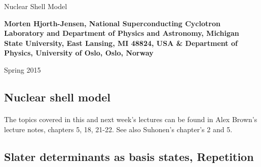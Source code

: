 \documentclass[%
twoside,                 %
final,                   %
10pt]{article}
\begin{document}






\thispagestyle{empty}

\begin{center}
{\LARGE\bf
\begin{spacing}{1.25}
Nuclear Shell Model
\end{spacing}
}
\end{center}


\begin{center}
{\bf Morten Hjorth-Jensen, National Superconducting Cyclotron Laboratory and Department of Physics and Astronomy, Michigan State University, East Lansing, MI 48824, USA {\&} Department of Physics, University of Oslo, Oslo, Norway${}^{}$} \\ [0mm]
\end{center}

    \begin{center}
\end{center}
    

\begin{center} %
Spring 2015
\end{center}

\vspace{1cm}


\subsection{Nuclear shell model}

\paragraph{}

The topics covered in this and next week's lectures can be found in Alex Brown's lecture notes, chapters 5, 18, 21-22.
See also Suhonen's chapter's 2 and 5.



\subsection{Slater determinants as basis states, Repetition}
\end{document}
